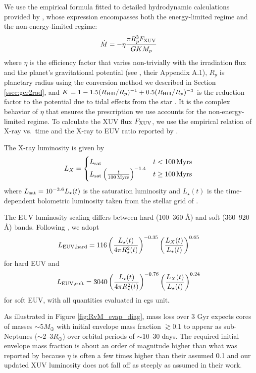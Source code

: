 \documentclass[twocolumn]{aastex631}
\begin{document}
We use the empirical formula fitted to detailed hydrodynamic calculations provided by \citet{Caldiroli21}, whose expression encompasses both the energy-limited regime and the non-energy-limited regime:
\begin{equation}
    \dot{M} = -\eta \frac{\pi R_p^3 F_{\rm XUV}}{G K M_p}
\end{equation}
where $\eta$ is the efficiency factor that varies non-trivially with the irradiation flux and the planet's gravitational potential (see \citealt{Caldiroli21}, their Appendix A.1), $R_p$ is planetary radius using the conversion method we described in Section \ref{ssec:gcr2rad}, and $K= 1 - 1.5 (R_{\rm Hill}/R_p)^{-1} + 0.5 (R_{\rm Hill}/R_p)^{-3}$ is the reduction factor to the potential due to tidal effects from the star \citep{Erkaev07}. It is the complex behavior of $\eta$ that ensures the prescription we use accounts for the non-energy-limited regime. To calculate the XUV flux $F_{\rm XUV}$, we use the empirical relation of X-ray vs.~time and the X-ray to EUV ratio reported by \citet{King21}. 

The X-ray luminosity is given by
\begin{equation}
    L_{X} = 
    \begin{cases}
    L_{\rm sat} & t < 100\,{\rm Myrs}\\
    L_{\rm sat}\left(\frac{t}{100\,{\rm Myrs}}\right)^{-1.4} & t \geq 100\,{\rm Myrs}
    \end{cases}
\end{equation}
where $L_{\rm sat} = 10^{-3.6}L_\star(t)$ is the saturation luminosity and $L_\star(t)$ is the time-dependent bolometric luminosity taken from the stellar grid of \citet{Johnstone21}.

The EUV luminosity scaling differs between hard (100--360 {\AA}) and soft (360--920 {\AA}) bands. Following \citet{King21}, we adopt
\begin{equation}
    L_{\rm EUV,hard} = 116\left(\frac{L_\star(t)}{4\pi R^2_\star(t)}\right)^{-0.35}\left(\frac{L_{X}(t)}{L_\star(t)}\right)^{0.65}
\end{equation}
for hard EUV and 
\begin{equation}
    L_{\rm EUV,soft} = 3040\left(\frac{L_\star(t)}{4\pi R^2_\star(t)}\right)^{-0.76}\left(\frac{L_{X}(t)}{L_\star(t)}\right)^{0.24}
\end{equation}
for soft EUV, with all quantities evaluated in cgs unit. 

As illustrated in Figure \ref{fig:RvM_evap_diag}, mass loss over 3 Gyr expects cores of masses $\sim$5$M_\oplus$ with initial envelope mass fraction $\gtrsim$0.1 to appear as sub-Neptunes ($\sim$2--3$R_\oplus$) over orbital periods of $\sim$10--30 days. The required initial envelope mass fraction is about an order of magnitude higher than what was reported by \citet{Owen17} because $\eta$ is often a few times higher than their assumed 0.1 \citep[see also][]{Kubyshkina18} and our updated XUV luminosity does not fall off as steeply as assumed in their work. 
\end{document}
